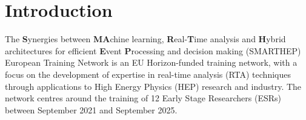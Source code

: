 \section{Introduction}
\label{intro}
The \textbf{S}ynergies between \textbf{MA}chine learning, \textbf{R}eal-\textbf{T}ime analysis and \textbf{H}ybrid architectures for efficient \textbf{E}vent \textbf{P}rocessing and decision making (SMARTHEP) European Training Network is an EU Horizon-funded training network, with a focus on the development of expertise in real-time analysis (RTA) techniques through applications to High Energy Physics (HEP) research and industry. The network centres around the training of 12 Early Stage Researchers (ESRs) between September 2021 and September 2025.